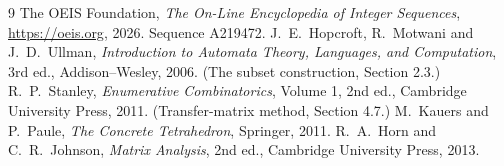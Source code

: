 \documentclass[11pt,a4paper]{article}
\theoremstyle{plain}
\theoremstyle{definition}
\begin{document}
\begin{thebibliography}{9}
 The OEIS Foundation, \emph{The On-Line Encyclopedia of Integer
Sequences}, \url{https://oeis.org}, 2026. Sequence A219472.
 J.~E.~Hopcroft, R.~Motwani and J.~D.~Ullman, \emph{Introduction to Automata
Theory, Languages, and Computation}, 3rd ed., Addison--Wesley, 2006. (The subset
construction, Section 2.3.)
 R.~P.~Stanley, \emph{Enumerative Combinatorics}, Volume 1, 2nd ed.,
Cambridge University Press, 2011. (Transfer-matrix method, Section 4.7.)
 M.~Kauers and P.~Paule, \emph{The Concrete Tetrahedron}, Springer, 2011.
 R.~A.~Horn and C.~R.~Johnson, \emph{Matrix Analysis}, 2nd ed., Cambridge
University Press, 2013.
\end{thebibliography}
\end{document}
